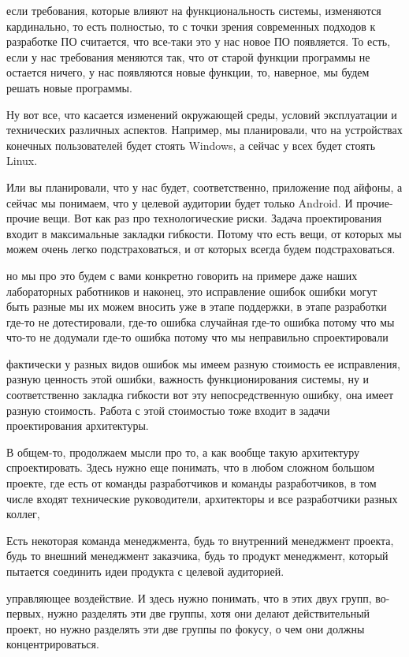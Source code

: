 если требования, которые влияют на функциональность системы, изменяются кардинально, то есть полностью, то с точки зрения современных подходов к разработке ПО считается, что все-таки это у нас новое ПО появляется. То есть, если у нас требования меняются так, что от старой функции программы не остается ничего, у нас появляются новые функции, то, наверное, мы будем решать новые программы.

Ну вот все, что касается изменений окружающей среды, условий эксплуатации и технических различных аспектов. Например, мы планировали, что на устройствах конечных пользователей будет стоять Windows, а сейчас у всех будет стоять Linux.

Или вы планировали, что у нас будет, соответственно, приложение под айфоны, а сейчас мы понимаем, что у целевой аудитории будет только Android. И прочие-прочие вещи. Вот как раз про технологические риски. Задача проектирования входит в максимальные закладки гибкости. Потому что есть вещи, от которых мы можем очень легко подстраховаться, и от которых всегда будем подстраховаться.

но мы про это будем с вами конкретно говорить на примере даже наших лабораторных работников и наконец, это исправление ошибок ошибки могут быть разные мы их можем вносить уже в этапе поддержки, в этапе разработки где-то не дотестировали, где-то ошибка случайная где-то ошибка потому что мы что-то не додумали где-то ошибка потому что мы неправильно спроектировали

фактически у разных видов ошибок мы имеем разную стоимость ее исправления, разную ценность этой ошибки, важность функционирования системы, ну и соответственно закладка гибкости вот эту непосредственную ошибку, она имеет разную стоимость. Работа с этой стоимостью тоже входит в задачи проектирования архитектуры.

В общем-то, продолжаем мысли про то, а как вообще такую архитектуру спроектировать. Здесь нужно еще понимать, что в любом сложном большом проекте, где есть от команды разработчиков и команды разработчиков, в том числе входят технические руководители, архитекторы и все разработчики разных коллег,

Есть некоторая команда менеджмента, будь то внутренний менеджмент проекта, будь то внешний менеджмент заказчика, будь то продукт менеджмент, который пытается соединить идеи продукта с целевой аудиторией.

управляющее воздействие. И здесь нужно понимать, что в этих двух групп, во-первых, нужно разделять эти две группы, хотя они делают действительный проект, но нужно разделять эти две группы по фокусу, о чем они должны концентрироваться.

